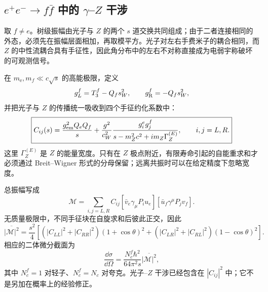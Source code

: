 








\subsection{$e^+e^-\to f\bar f$ 中的 $\gamma$--$Z$ 干涉}

取 $f\neq e$。树级振幅由光子与 $Z$ 的两个 $s$ 道交换共同组成；由于二者连接相同的外态，必须先在振幅层面相加，再取模平方。光子对左右手费米子的耦合相同，而 $Z$ 的中性流耦合具有手征性，因此角分布中的左右不对称直接成为电弱宇称破坏的可观测信号。

在 $m_{\mathrm e},m_f\ll c\sqrt s$ 的高能极限，定义
\begin{equation*}
g_L^f=T_3^f-Q_fs_W^2,
\qquad
g_{\rm R}^f=-Q_fs_W^2,
\end{equation*}
并把光子与 $Z$ 的传播统一吸收到四个手征约化系数中：
\begin{equation}
\boxed{
C_{ij}(s)
=\frac{g_{\rm em}^2Q_eQ_f}{s}
+\frac{g^2}{c_W^2}\frac{g_i^eg_j^f}
{s-m_Z^2c^2+i m_Z\Gamma_Z^{(E)}},
\qquad i,j=L,R.}
\label{eq:eeff-chiral-coeff-dp11}
\end{equation}
这里 $\Gamma_Z^{(E)}$ 是 $Z$ 的能量宽度。只有在 $Z$ 极点附近，有限寿命引起的自能重求和才必须通过 Breit--Wigner 形式的分母保留；远离共振时可以在给定精度下忽略宽度。

总振幅写成
\begin{equation*}
\mathcal M
=\sum_{i,j=L,R}C_{ij}
[\bar v_e\gamma_\mu P_i u_e]
[\bar u_f\gamma^\mu P_jv_f].
\end{equation*}
无质量极限中，不同手征块在自旋求和后彼此正交，因此
\begin{equation}
\boxed{
\overline{|\mathcal M|^2}
=\frac{s^2}{4}\left[
(|C_{LL}|^2+|C_{RR}|^2)(1+\cos\theta)^2
+(|C_{LR}|^2+|C_{RL}|^2)(1-\cos\theta)^2
\right].}
\label{eq:eeff-spin-summed-dp11}
\end{equation}
相应的二体微分截面为
\begin{equation*}
\frac{\dd\sigma}{\dd\Omega}
=\frac{N_c^f\hbar^2}{64\pi^2s}\overline{|\mathcal M|^2},
\end{equation*}
其中 $N_c^f=1$ 对轻子、$N_c^f=N_c$ 对夸克。光子--$Z$ 干涉已经包含在 $|C_{ij}|^2$ 中；它不是另加在概率上的经验修正。

